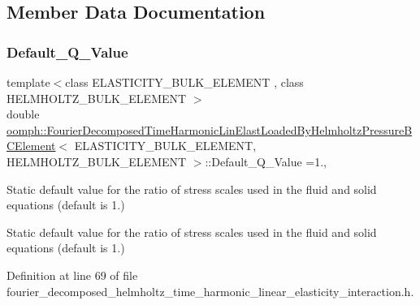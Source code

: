 \subsection{Member Data Documentation}
\mbox{\label{classoomph_1_1FourierDecomposedTimeHarmonicLinElastLoadedByHelmholtzPressureBCElement_a6a24eef8286abb640d8edf3fa0f71e2c}} 
\subsubsection{\texorpdfstring{Default\+\_\+\+Q\+\_\+\+Value}{Default\_Q\_Value}}
{\footnotesize\ttfamily template$<$class E\+L\+A\+S\+T\+I\+C\+I\+T\+Y\+\_\+\+B\+U\+L\+K\+\_\+\+E\+L\+E\+M\+E\+NT , class H\+E\+L\+M\+H\+O\+L\+T\+Z\+\_\+\+B\+U\+L\+K\+\_\+\+E\+L\+E\+M\+E\+NT $>$ \\
double \hyperlink{classoomph_1_1FourierDecomposedTimeHarmonicLinElastLoadedByHelmholtzPressureBCElement}{oomph\+::\+Fourier\+Decomposed\+Time\+Harmonic\+Lin\+Elast\+Loaded\+By\+Helmholtz\+Pressure\+B\+C\+Element}$<$ E\+L\+A\+S\+T\+I\+C\+I\+T\+Y\+\_\+\+B\+U\+L\+K\+\_\+\+E\+L\+E\+M\+E\+NT, H\+E\+L\+M\+H\+O\+L\+T\+Z\+\_\+\+B\+U\+L\+K\+\_\+\+E\+L\+E\+M\+E\+NT $>$\+::Default\+\_\+\+Q\+\_\+\+Value =1.\hspace{0.3cm}{\ttfamily [static]}, {\ttfamily [protected]}}



Static default value for the ratio of stress scales used in the fluid and solid equations (default is 1.) 

Static default value for the ratio of stress scales used in the fluid and solid equations (default is 1.) 

Definition at line 69 of file fourier\+\_\+decomposed\+\_\+helmholtz\+\_\+time\+\_\+harmonic\+\_\+linear\+\_\+elasticity\+\_\+interaction.\+h.



